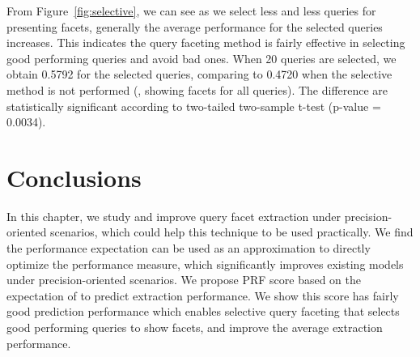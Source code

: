From Figure~\ref{fig:selective}, we can see as we select less and less queries for presenting facets, generally the average performance for the selected queries increases. This indicates the query faceting method is fairly effective in selecting good performing queries and avoid bad ones. When 20 queries are selected, we obtain 0.5792  for the selected queries, comparing to 0.4720 when the selective method is not performed (\ie, showing facets for all queries). The difference are statistically significant according to two-tailed two-sample t-test (p-value = 0.0034). 


\section{Conclusions}
\label{sec:precision-conclusion}
In this chapter, we study and improve query facet extraction under precision-oriented scenarios, which could help this technique to be used practically. We find the performance expectation can be used as an approximation to directly optimize the performance measure, which significantly improves existing models under precision-oriented scenarios. We propose PRF score based on the expectation of \PRF to predict extraction performance. We show this score has fairly good prediction performance which enables selective query faceting that selects good performing queries to show facets, and improve the average extraction performance.